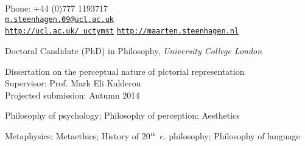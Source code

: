 \documentclass[11pt]{article}
\makeatletter
\def\myemail{m.steenhagen.09@ucl.ac.uk}
\def\myweb{http://ucl.ac.uk/\string~uctymst}
\def\myblog{http://maarten.steenhagen.nl}
\def\myphone{+44 (0)777 1193717}
\makeatother
\begin{document}
\begin{minipage}[t]{2.95in}
  
\end{minipage}
\hfill     
\hfill
\begin{minipage}[t]{1.7in}
  \flushright \footnotesize Phone: \myphone \\  
  {\scriptsize  \texttt{\href{mailto:\myemail}{\myemail}}} \\
  {\scriptsize  \texttt{\href{\myweb}{\myweb}}}
	{\scriptsize  \texttt{\href{\myblog}{\myblog}}}
\end{minipage}


\vfil

\reversemarginpar

\bigskip       

\medskip


\ind Doctoral Candidate (PhD) in Philosophy, \emph{University College London \vspace{0.01in}}

\ind Dissertation on the perceptual nature of pictorial representation\\ Supervisor: Prof. Mark Eli Kalderon\\Projected submission: Autumn 2014

\bigskip
\bigskip


\ind Philosophy of psychology; Philosophy of perception; Aesthetics

\bigskip
\bigskip


\ind Metaphysics; Metaethics; History of 20$^{\textrm{\tiny{th}}}$ c. philosophy; Philosophy of language

\bigskip
\bigskip
\vfil 
{}
\end{document}

